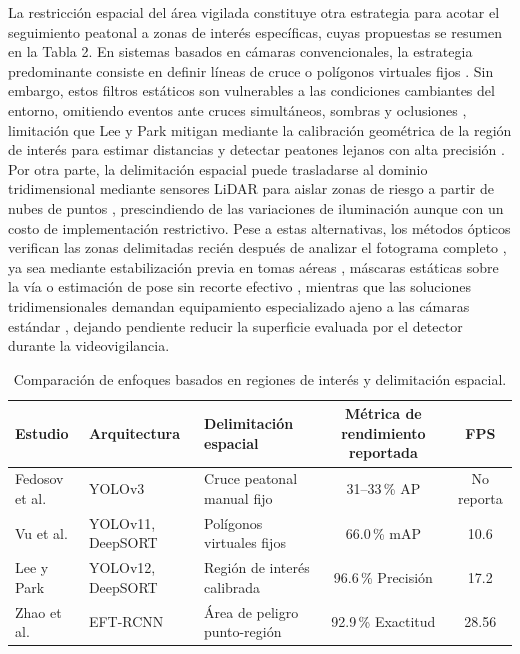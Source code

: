 \documentclass[runningheads]{llncs}
\begin{document}
La restricción espacial del área vigilada constituye otra estrategia para acotar el seguimiento peatonal a zonas de interés específicas, cuyas propuestas se resumen en la Tabla 2. En sistemas basados en cámaras convencionales, la estrategia predominante consiste en definir líneas de cruce o polígonos virtuales fijos \cite{fedosov2021,vu2026}. Sin embargo, estos filtros estáticos son vulnerables a las condiciones cambiantes del entorno, omitiendo eventos ante cruces simultáneos, sombras y oclusiones \cite{vu2026}, limitación que Lee y Park \cite{lee2026} mitigan mediante la calibración geométrica de la región de interés para estimar distancias y detectar peatones lejanos con alta precisión \cite{lee2026}. Por otra parte, la delimitación espacial puede trasladarse al dominio tridimensional mediante sensores LiDAR para aislar zonas de riesgo a partir de nubes de puntos \cite{zhao2025}, prescindiendo de las variaciones de iluminación aunque con un costo de implementación restrictivo. Pese a estas alternativas, los métodos ópticos verifican las zonas delimitadas recién después de analizar el fotograma completo \cite{lee2026,fedosov2021,vu2026}, ya sea mediante estabilización previa en tomas aéreas \cite{jimenez2026}, máscaras estáticas sobre la vía \cite{yang2024} o estimación de pose sin recorte efectivo \cite{thosar2025}, mientras que las soluciones tridimensionales demandan equipamiento especializado ajeno a las cámaras estándar \cite{zhao2025}, dejando pendiente reducir la superficie evaluada por el detector durante la videovigilancia.

\begin{table}[!ht]
\centering
\scriptsize
\setlength{\tabcolsep}{5pt}
\renewcommand{\arraystretch}{1.1}
\begin{tabular}{|p{2.2cm}|p{2.3cm}|p{3.0cm}|c|c|}
\hline
{\bfseries Estudio} & {\bfseries Arquitectura} & {\bfseries Delimitación espacial} & {\bfseries Métrica de rendimiento reportada} & {\bfseries FPS}\\
\hline
Fedosov et al. \cite{fedosov2021} & YOLOv3 & Cruce peatonal manual fijo & 31--33\,\% AP & No reporta\\
\hline
Vu et al. \cite{vu2026} & YOLOv11, DeepSORT & Polígonos virtuales fijos & 66.0\,\% mAP & 10.6\\
\hline
Lee y Park \cite{lee2026} & YOLOv12, DeepSORT & Región de interés calibrada & 96.6\,\% Precisión & 17.2\\
\hline
Zhao et al. \cite{zhao2025} & EFT-RCNN & Área de peligro punto-región & 92.9\,\% Exactitud & 28.56\\
\hline
\end{tabular}
\vspace{2.5mm}
\caption{Comparación de enfoques basados en regiones de interés y delimitación espacial.}\label{tab2}
\end{table}
\end{document}
